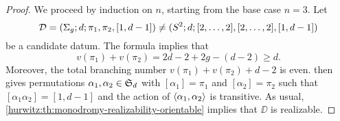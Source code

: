 \begin{proof}
We proceed by induction on $n$, starting from the base case $n=3$. Let
\[
\mathcal{D}=(\Sigma_{g};d;\pi_1,\pi_2,[1,d-1])\neq(S^2{};d;[2,\ldots,2],[2,\ldots,2],[1,d-1])
\]
be a candidate datum. The \RH{} formula implies that
\[
v(\pi_1)+v(\pi_2)=2d-2+2g-(d-2)\ge d.
\]
Moreover, the total branching number $v(\pi_1)+v(\pi_2)+d-2$ is even.  then gives permutations $\alpha_1,\alpha_2\in\symgroup[d]$ with $[\alpha_1]=\pi_1$ and $[\alpha_2]=\pi_2$ such that $[\alpha_1\alpha_2]=[1,d-1]$ and the action of $\left\langle\alpha_1,\alpha_2\right\rangle$ is transitive. As usual, \cref{hurwitz:th:monodromy-realizability-orientable} implies that $\DD$ is realizable.


\end{proof}
